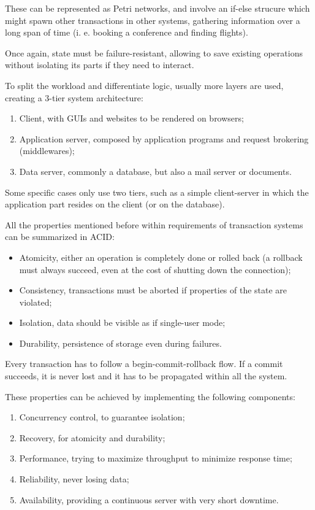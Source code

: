 These can be represented as Petri networks, and involve an if-else strucure which might spawn other transactions in other systems, gathering information over a long span of time (i. e. booking a conference and finding flights).

Once again, state must be failure-resistant, allowing to save existing operations without isolating its parts if they need to interact. 

To split the workload and differentiate logic, usually more layers are used, creating a 3-tier system architecture:
\begin{enumerate}
	\item Client, with GUIs and websites to be rendered on browsers;
	\item Application server, composed by application programs and request brokering (middlewares);
	\item Data server, commonly a database, but also a mail server or documents.
\end{enumerate}
Some specific cases only use two tiers, such as a simple client-server in which the application part resides on the client (or on the database).

All the properties mentioned before within requirements of transaction systems can be summarized in ACID:
\begin{itemize}
	\item Atomicity, either an operation is completely done or rolled back (a rollback must always succeed, even at the cost of shutting down the connection);
	\item Consistency, transactions must be aborted if properties of the state are violated;
	\item Isolation, data should be visible as if single-user mode;
	\item Durability, persistence of storage even during failures. 
\end{itemize}
Every transaction has to follow a begin-commit-rollback flow. If a commit succeeds, it is never lost and it has to be propagated within all the system.

These properties can be achieved by implementing the following components:
\begin{enumerate}
	\item Concurrency control, to guarantee isolation;
	\item Recovery, for atomicity and durability;
	\item Performance, trying to maximize throughput to minimize response time;
	\item Reliability, never losing data;
	\item Availability, providing a continuous server with very short downtime.
\end{enumerate}

